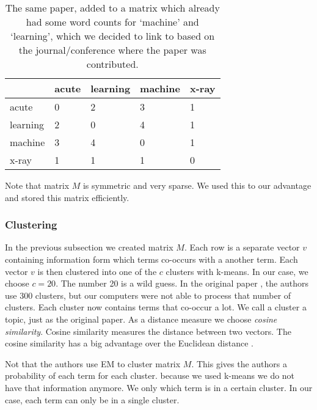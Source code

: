 \begin{table}
	\label{tab:after}
	\begin{center}

\begin{tabular}{|l|l|l|l|l|}
\hline
	 	& acute  & learning & machine &  x-ray \\ \hline
acute 	&	0 	& 	2 &	 3 &  1	 \\ \hline
learning&	2	&	0 &	 4 &  1	 \\ \hline
machine &	3	&	4 &	 0 &  1	 \\ \hline
x-ray	&	1	&	1 &	 1 &  0	 \\ \hline
\end{tabular} 

\caption{The same paper, added to a matrix which already had some word counts for `machine' and `learning', which we decided to link to based on the journal/conference where the paper was contributed.}
	\end{center}
\end{table}

Note that matrix $M$ is symmetric and very sparse. We used this to our advantage and stored this matrix efficiently.


\subsubsection*{Clustering}

In the previous subsection we created matrix $M$. Each row is a separate vector $v$ containing information form which terms co-occurs with a another term. Each vector $v$ is then clustered into one of the $c$ clusters with k-means. In our case, we choose  $c = 20$. The number 20 is a wild guess. In the original paper \cite{steyvers2004probabilistic}, the authors use 300 clusters, but our computers were not able to process that number of clusters. Each cluster now contains terms that co-occur a lot. We call a cluster a topic, just as the original paper. As a distance measure we choose \emph{cosine similarity}. Cosine similarity measures the distance between two vectors. The cosine similarity has a big advantage over the Euclidean distance \cite{chowdhury2010introduction}.  

Not that the authors use EM to cluster matrix $M$. This gives the authors a probability of each term for each cluster. because we used k-means we do not have that information anymore. We only which term is in a certain cluster. In our case, each term can only be in a single cluster.

